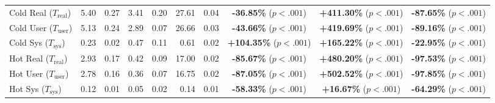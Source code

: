 \begin{table}[htbp]
{\begin{tabular}{l r@{\,$\pm$\,}l r@{\,$\pm$\,}l r@{\,$\pm$\,}l c c c}
\midrule
Cold Real ($T_\mathrm{real}$) & 5.40 & 0.27 & 3.41 & 0.20 & 27.61 & 0.04 & \textbf{-36.85\%} ($p<.001$) & \textbf{+411.30\%} ($p<.001$) & \textbf{-87.65\%} ($p<.001$) \\
Cold User ($T_\mathrm{user}$) & 5.13 & 0.24 & 2.89 & 0.07 & 26.66 & 0.03 & \textbf{-43.66\%} ($p<.001$) & \textbf{+419.69\%} ($p<.001$) & \textbf{-89.16\%} ($p<.001$) \\
Cold Sys ($T_\mathrm{sys}$) & 0.23 & 0.02 & 0.47 & 0.11 & 0.61 & 0.02 & \textbf{+104.35\%} ($p<.001$) & \textbf{+165.22\%} ($p<.001$) & \textbf{-22.95\%} ($p<.001$) \\
Hot Real ($T_\mathrm{real}$) & 2.93 & 0.17 & 0.42 & 0.09 & 17.00 & 0.02 & \textbf{-85.67\%} ($p<.001$) & \textbf{+480.20\%} ($p<.001$) & \textbf{-97.53\%} ($p<.001$) \\
Hot User ($T_\mathrm{user}$) & 2.78 & 0.16 & 0.36 & 0.07 & 16.75 & 0.02 & \textbf{-87.05\%} ($p<.001$) & \textbf{+502.52\%} ($p<.001$) & \textbf{-97.85\%} ($p<.001$) \\
Hot Sys ($T_\mathrm{sys}$) & 0.12 & 0.01 & 0.05 & 0.02 & 0.14 & 0.01 & \textbf{-58.33\%} ($p<.001$) & \textbf{+16.67\%} ($p<.001$) & \textbf{-64.29\%} ($p<.001$) \\
\bottomrule
\end{tabular}
}
\end{table}



